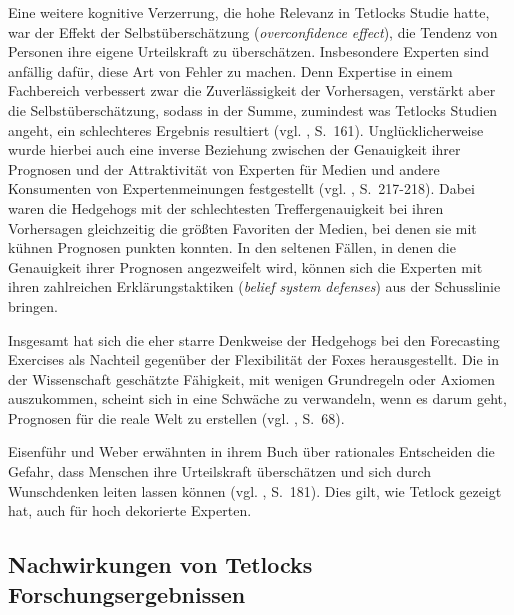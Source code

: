 Eine weitere kognitive Verzerrung,
die hohe Relevanz in Tetlocks Studie hatte, war der Effekt der
Selbstüberschätzung (\emph{overconfidence effect}), die Tendenz von Personen ihre
eigene Urteilskraft zu überschätzen. Insbesondere Experten sind
anfällig dafür, diese Art von Fehler zu machen. Denn Expertise in einem
Fachbereich verbessert zwar die Zuverlässigkeit der Vorhersagen, verstärkt aber
die Selbstüberschätzung, sodass in der Summe, zumindest was Tetlocks Studien
angeht, ein schlechteres Ergebnis resultiert (vgl. \cite{Tetlock}, S.~161).
Unglücklicherweise wurde hierbei auch eine inverse Beziehung zwischen der
Genauigkeit ihrer Prognosen und der Attraktivität von Experten für Medien und andere 
Konsumenten von Expertenmeinungen festgestellt (vgl. \cite{Tetlock}, S.~217-218).
Dabei waren die Hedgehogs mit der schlechtesten Treffergenauigkeit bei ihren
Vorhersagen gleichzeitig die größten Favoriten der Medien, bei denen sie mit
kühnen Prognosen punkten konnten. In den seltenen Fällen, in denen die Genauigkeit
ihrer Prognosen angezweifelt wird, können sich die Experten mit ihren zahlreichen
Erklärungstaktiken (\emph{belief system defenses}) aus der Schusslinie bringen.

Insgesamt hat sich die eher starre Denkweise der Hedgehogs bei den Forecasting
Exercises als Nachteil gegenüber der Flexibilität der Foxes herausgestellt. 
Die in der Wissenschaft geschätzte Fähigkeit, mit wenigen Grundregeln oder
Axiomen auszukommen, scheint sich in eine Schwäche zu verwandeln, wenn
es darum geht, Prognosen für die reale Welt zu erstellen (vgl. \cite{Tetlock},
S.~68).

Eisenführ und Weber erwähnten in ihrem Buch über rationales Entscheiden die Gefahr,
dass Menschen ihre Urteilskraft überschätzen und sich durch
Wunschdenken leiten lassen können (vgl. \cite{Eisenfuehr}, S.~181). 
Dies gilt, wie Tetlock gezeigt hat, auch für hoch dekorierte Experten.

\subsection{Nachwirkungen von Tetlocks Forschungsergebnissen}

